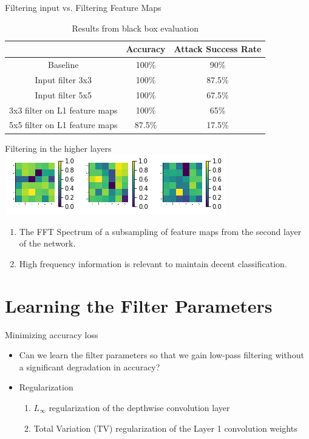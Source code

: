 \documentclass{beamer}
\begin{document}
\begin{frame}{Filtering input vs. Filtering Feature Maps}
\begin{table}[h!]
  \begin{center}
    \caption{Results from black box evaluation}
    \label{tab:transfer}
    \begin{tabular}{c|c|c} %
      & \textbf{Accuracy} & \textbf{Attack Success Rate}\\
      \hline
      Baseline & 100\% & 90\%\\
      Input filter 3x3 & 100\% & 87.5\%\\
      Input filter 5x5 & 100\% & 67.5\%\\
      3x3 filter on L1 feature maps & 100\% & 65\%\\
      5x5 filter on L1 feature maps & 87.5\% & 17.5\%\\
    \end{tabular}
  \end{center}
\end{table}
\end{frame}

\begin{frame}{Filtering in the higher layers}
	\centering
	\includegraphics[scale=0.7]{higher_filters.png}
	\begin{enumerate}
		\item The FFT Spectrum of a subsampling of feature maps from the second layer of the network.
		\pause
		\item High frequency information is relevant to maintain decent classification.
	\end{enumerate}
\end{frame}

\section{Learning the Filter Parameters}
\begin{frame}{Minimizing accuracy loss}
	\centering
	\begin{itemize}
		\item Can we learn the filter parameters so that we gain low-pass filtering without a significant degradation in accuracy? \pause
		\item Regularization
			\begin{enumerate}
				\item $L_{\infty}$ regularization of the depthwise convolution layer
				\pause
				\item Total Variation (TV) regularization of the Layer 1 convolution weights
			\end{enumerate}
	\end{itemize}
\end{frame}
\end{document}
